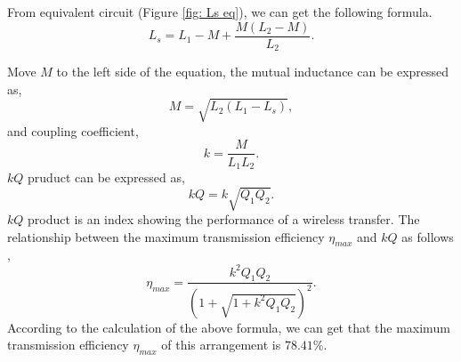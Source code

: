 From equivalent circuit (Figure \ref{fig: Ls eq}), we can get the following formula.
\begin{equation}
    L_s = L_1 - M + \frac{M(L_2 - M)}{L_2}.
\end{equation}

Move $M$ to the left side of the equation, the mutual inductance can be expressed as,
\begin{equation}
    M = \sqrt{L_2(L_1-L_s)},
\end{equation}
and coupling coefficient,
\begin{equation}
    k = \frac{M}{L_1L_2}.
\end{equation}
$kQ$ pruduct can be expressed as,
\begin{equation}
    kQ = k\sqrt{Q_1Q_2}.
\end{equation}
$kQ$ product is an index showing the performance of a wireless transfer. The relationship between the maximum transmission efficiency $\eta_{max}$ and $kQ$ as follows \cite{Li2015, Ohira2014},
\begin{equation}
    \eta_{max} = \frac{k^2Q_1Q_2}{(1+\sqrt{1+k^2Q_1Q_2})^2}.
\end{equation}
According to the calculation of the above formula, we can get that the maximum transmission efficiency $\eta_{max}$ of this arrangement is $78.41\%$.

